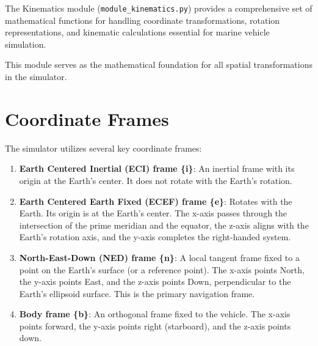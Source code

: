 \documentclass[
  letterpaper,
  DIV=11,
  numbers=noendperiod]{scrreprt}
\providecommand{\tightlist}{%
  \setlength{\itemsep}{0pt}\setlength{\parskip}{0pt}}\usepackage{longtable,booktabs,array}
\begin{document}
The Kinematics module (\texttt{module\_kinematics.py}) provides a
comprehensive set of mathematical functions for handling coordinate
transformations, rotation representations, and kinematic calculations
essential for marine vehicle simulation.

\begin{tcolorbox}[enhanced jigsaw, colback=white, toptitle=1mm, colframe=quarto-callout-tip-color-frame, rightrule=.15mm, breakable, title=\textcolor{quarto-callout-tip-color}{\faLightbulb}\hspace{0.5em}{Tip}, toprule=.15mm, opacitybacktitle=0.6, opacityback=0, coltitle=black, leftrule=.75mm, colbacktitle=quarto-callout-tip-color!10!white, arc=.35mm, titlerule=0mm, bottomtitle=1mm, bottomrule=.15mm, left=2mm]

This module serves as the mathematical foundation for all spatial
transformations in the simulator.

\end{tcolorbox}

\section*{Coordinate Frames}\label{coordinate-frames}


The simulator utilizes several key coordinate frames:

\begin{enumerate}
\def\labelenumi{\arabic{enumi}.}
\tightlist
\item
  \textbf{Earth Centered Inertial (ECI) frame \{i\}}: An inertial frame
  with its origin at the Earth's center. It does not rotate with the
  Earth's rotation.
\item
  \textbf{Earth Centered Earth Fixed (ECEF) frame \{e\}}: Rotates with
  the Earth. Its origin is at the Earth's center. The x-axis passes
  through the intersection of the prime meridian and the equator, the
  z-axis aligns with the Earth's rotation axis, and the y-axis completes
  the right-handed system.
\item
  \textbf{North-East-Down (NED) frame \{n\}}: A local tangent frame
  fixed to a point on the Earth's surface (or a reference point). The
  x-axis points North, the y-axis points East, and the z-axis points
  Down, perpendicular to the Earth's ellipsoid surface. This is the
  primary navigation frame.
\item
  \textbf{Body frame \{b\}}: An orthogonal frame fixed to the vehicle.
  The x-axis points forward, the y-axis points right (starboard), and
  the z-axis points down.
\end{enumerate}
\end{document}
